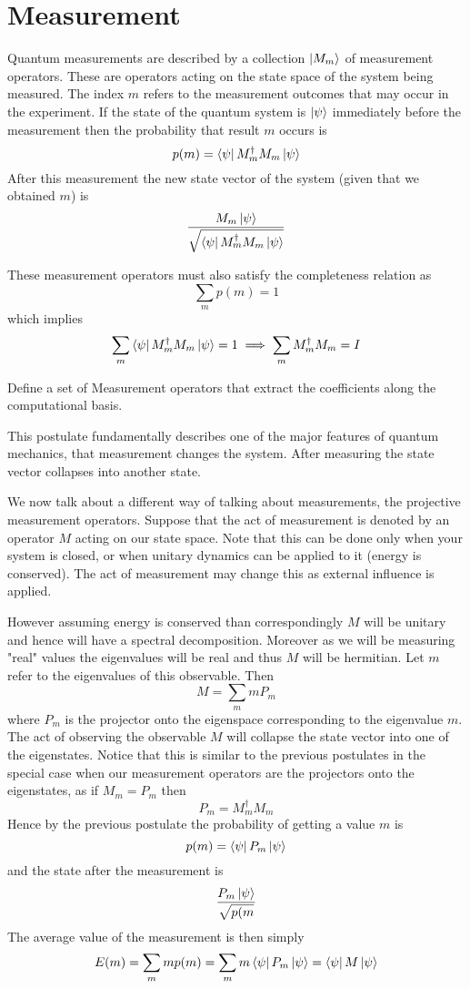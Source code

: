 \section{Measurement}
\begin{postulate}
Quantum measurements are described by a collection $\ket{M_m}$ of measurement operators. These are operators acting on the state space of the system being measured. The index $m$ refers to the measurement outcomes that may occur in the experiment. If the state of the quantum system is $\ket{\psi}$ immediately before the measurement then the probability that result $m$ occurs is
$$ p(m) = \bra{\psi}M_m^{\dagger}M_m\ket{\psi} $$
After this measurement the new state vector of the system (given that we obtained $m$) is 
$$ \frac{M_m\ket{\psi}}{\sqrt{\bra{\psi}M_m^{\dagger}M_m\ket{\psi}}} $$
\end{postulate}

These measurement operators must also satisfy the completeness relation as 
$$ \sum_m p(m) = 1$$ which implies $$ \sum_m \bra{\psi}M_m^{\dagger}M_m\ket{\psi} = 1 \implies \sum_m M_m^{\dagger}M_m = I$$

\begin{exercise}
Define a set of Measurement operators that extract the coefficients along the computational basis.
\end{exercise}

This postulate fundamentally describes one of the major features of quantum mechanics, that measurement changes the system. After measuring the state vector collapses into another state.

We now talk about a different way of talking about measurements, the projective measurement operators. Suppose that the act of measurement is denoted by an operator $M$ acting on our state space. Note that this can be done only when your system is closed, or when unitary dynamics can be applied to it (energy is conserved). The act of measurement may change this as external influence is applied.

However assuming energy is conserved than correspondingly $M$ will be unitary and hence will have a spectral decomposition. Moreover as we will be measuring "real" values the eigenvalues will be real and thus $M$ will be hermitian.
Let $m$ refer to the eigenvalues of this observable. Then 
$$ M = \sum_m mP_m $$ 
where $P_m$ is the projector onto the eigenspace corresponding to the eigenvalue $m$. The act of observing the observable $M$ will collapse the state vector into one of the eigenstates. Notice that this is similar to the previous postulates in the special case when our measurement operators are the projectors onto the eigenstates, as if $M_m = P_m$ then $$P_m = M_m^{\dagger}M_m$$
Hence by the previous postulate the probability of getting a value $m$ is 
$$p(m) = \bra{\psi}P_m\ket{\psi}$$ and the state after the measurement is $$\frac{P_{m}\ket{\psi}}{\sqrt{p(m}}$$ The average value of the measurement is then simply $$E(m) = \sum_m mp(m) \\ = \sum_m m\bra{\psi}P_m\ket{\psi} = \bra{\psi}M\ket{\psi}$$

